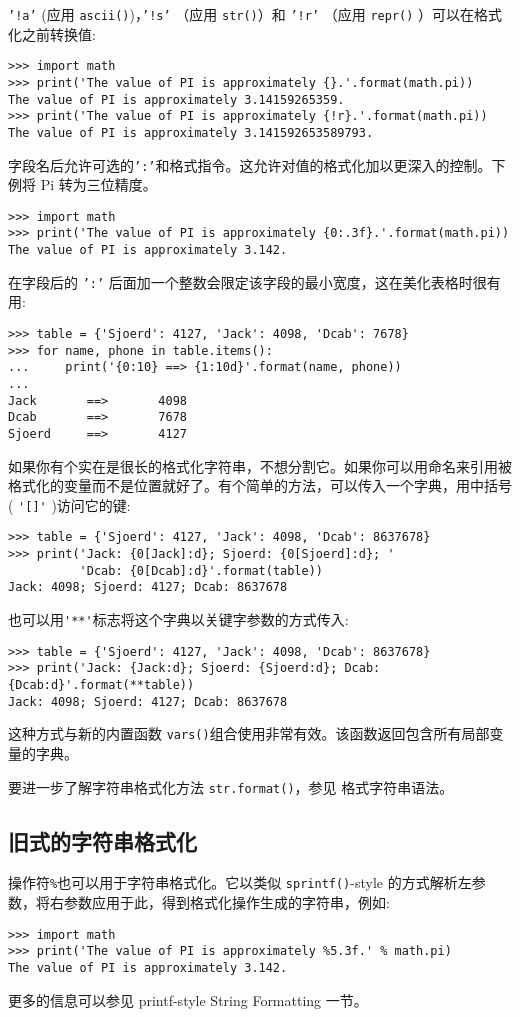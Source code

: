 \texttt{'!a'} (应用 \texttt{ascii()})，\texttt{'!s'} （应用 \texttt{str()}）和 \texttt{'!r'} （应用 \texttt{repr()} ）可以在格式化之前转换值:
\begin{lstlisting}
>>> import math
>>> print('The value of PI is approximately {}.'.format(math.pi))
The value of PI is approximately 3.14159265359.
>>> print('The value of PI is approximately {!r}.'.format(math.pi))
The value of PI is approximately 3.141592653589793.
\end{lstlisting}
字段名后允许可选的\texttt{':'}和格式指令。这允许对值的格式化加以更深入的控制。下例将 Pi 转为三位精度。
\begin{lstlisting}
>>> import math
>>> print('The value of PI is approximately {0:.3f}.'.format(math.pi))
The value of PI is approximately 3.142.
\end{lstlisting}
在字段后的 \texttt{':'} 后面加一个整数会限定该字段的最小宽度，这在美化表格时很有用:
\begin{lstlisting}
>>> table = {'Sjoerd': 4127, 'Jack': 4098, 'Dcab': 7678}
>>> for name, phone in table.items():
...     print('{0:10} ==> {1:10d}'.format(name, phone))
...
Jack       ==>       4098
Dcab       ==>       7678
Sjoerd     ==>       4127
\end{lstlisting}
如果你有个实在是很长的格式化字符串，不想分割它。如果你可以用命名来引用被格式化的变量而不是位置就好了。有个简单的方法，可以传入一个字典，用中括号( \verb|'[]'| )访问它的键:
\begin{lstlisting}
>>> table = {'Sjoerd': 4127, 'Jack': 4098, 'Dcab': 8637678}
>>> print('Jack: {0[Jack]:d}; Sjoerd: {0[Sjoerd]:d}; '
          'Dcab: {0[Dcab]:d}'.format(table))
Jack: 4098; Sjoerd: 4127; Dcab: 8637678
\end{lstlisting}
也可以用\verb|'**'|标志将这个字典以关键字参数的方式传入:
\begin{lstlisting}
>>> table = {'Sjoerd': 4127, 'Jack': 4098, 'Dcab': 8637678}
>>> print('Jack: {Jack:d}; Sjoerd: {Sjoerd:d}; Dcab: {Dcab:d}'.format(**table))
Jack: 4098; Sjoerd: 4127; Dcab: 8637678
\end{lstlisting}
这种方式与新的内置函数 \texttt{vars()}组合使用非常有效。该函数返回包含所有局部变量的字典。

要进一步了解字符串格式化方法 \texttt{str.format()}，参见 格式字符串语法。
\subsection{旧式的字符串格式化}
操作符\verb|%|也可以用于字符串格式化。它以类似 \texttt{sprintf()}-style 的方式解析左参数，将右参数应用于此，得到格式化操作生成的字符串，例如:
\begin{lstlisting}
>>> import math
>>> print('The value of PI is approximately %5.3f.' % math.pi)
The value of PI is approximately 3.142.
\end{lstlisting}
更多的信息可以参见 printf-style String Formatting 一节。
